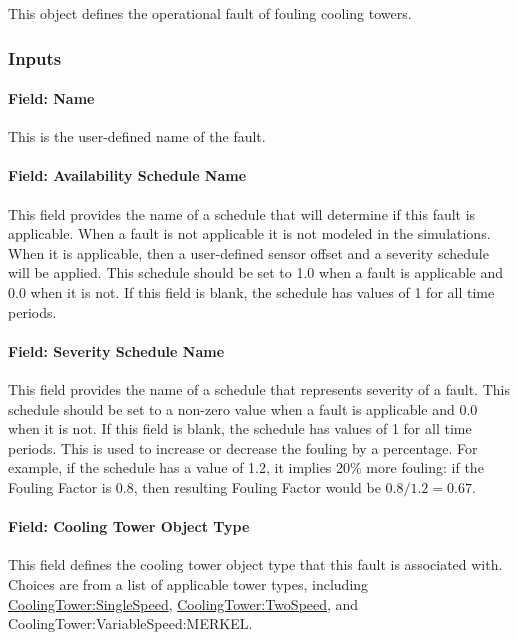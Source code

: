 This object defines the operational fault of fouling cooling towers.

\subsubsection{Inputs}

\paragraph{Field: Name}

This is the user-defined name of the fault.

\paragraph{Field: Availability Schedule Name}

This field provides the name of a schedule that will determine if this fault is applicable. When a fault is not applicable it is not modeled in the simulations. When it is applicable, then a user-defined sensor offset and a severity schedule will be applied. This schedule should be set to 1.0 when a fault is applicable and 0.0 when it is not. If this field is blank, the schedule has values of 1 for all time periods.

\paragraph{Field: Severity Schedule Name}

This field provides the name of a schedule that represents severity of a fault. This schedule should be set to a non-zero value when a fault is applicable and 0.0 when it is not. If this field is blank, the schedule has values of 1 for all time periods.
This is used to increase or decrease the fouling by a percentage. For example, if the schedule has a value of 1.2, it implies 20\% more fouling: if the Fouling Factor is 0.8, then resulting Fouling Factor would be $0.8 / 1.2 = 0.67$.

\paragraph{Field: Cooling Tower Object Type}\label{field-tower-object-type}

This field defines the cooling tower object type that this fault is associated with. Choices are from a list of applicable tower types, including \hyperref[coolingtowersinglespeed]{CoolingTower:SingleSpeed}, \hyperref[coolingtowertwospeed]{CoolingTower:TwoSpeed}, and CoolingTower:VariableSpeed:MERKEL.

